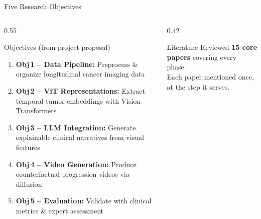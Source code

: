 \documentclass[aspectratio=169,xcolor=dvipsnames]{beamer}
\begin{document}
\begin{frame}{Five Research Objectives}
    \begin{columns}
        \begin{column}{0.55\textwidth}
            \begin{block}{ Objectives (from project proposal)}
                \small
                \begin{enumerate}
                    \item \textbf{Obj\,1 -- Data Pipeline:} Preprocess \& organize longitudinal cancer imaging data

                    \vspace{0.2em}
                    \item \textbf{Obj\,2 -- ViT Representations:} Extract temporal tumor embeddings with Vision Transformers

                    \vspace{0.2em}
                    \item \textbf{Obj\,3 -- LLM Integration:} Generate explainable clinical narratives from visual features

                    \vspace{0.2em}
                    \item \textbf{Obj\,4 -- Video Generation:} Produce counterfactual progression videos via diffusion

                    \vspace{0.2em}
                    \item \textbf{Obj\,5 -- Evaluation:} Validate with clinical metrics \& expert assessment
                \end{enumerate}
            \end{block}
        \end{column}

        \begin{column}{0.42\textwidth}
            \vspace{0.3em}

            \begin{exampleblock}{\small Literature Reviewed}
                \small \textbf{15 core papers} covering every phase.\\
                Each paper mentioned once, at the step it serves.
            \end{exampleblock}
        \end{column}
    \end{columns}
\end{frame}
\end{document}

